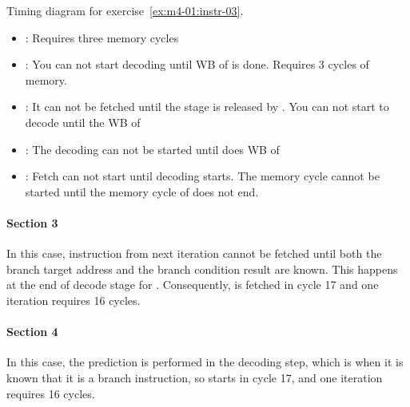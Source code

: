\begin{table}[htb]

\caption{Timing diagram for exercise~\ref{ex:m4-01:instr-03}.}
\label{tab1:sol-oct-2013}
\end{table}

\begin{itemize}

\item {}: Requires three memory cycles

\item {}: You can not start decoding until WB of  is done. Requires 3 cycles of memory.

\item {}: It can not be fetched until the stage is released by . You can not start to decode until the WB of 

\item {}: The decoding can not be started until  does WB of 

\item {}: Fetch can not start until  decoding starts. The memory cycle cannot be started  until the memory cycle of  does not end.

\end{itemize}

\paragraph{Section 3}

In this case, instruction  from next iteration cannot be
fetched until both the branch target address and the branch condition result
are known. This happens at the end of decode stage for . 
Consequently,  is fetched in cycle 17 and one iteration
requires 16 cycles.

\paragraph{Section 4}

In this case, the prediction is performed in the decoding step, which is
when it is known that it is a branch instruction, so 
starts in cycle 17, and one iteration requires 16 cycles.

\clearpage
